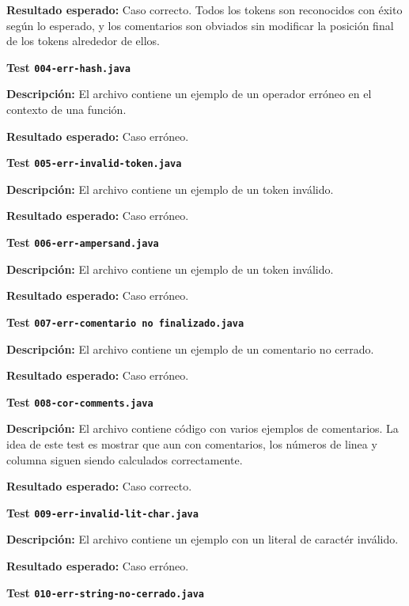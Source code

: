 \documentclass [a4paper,titlepage]{report}
\begin{document}
\textbf{Resultado esperado:} Caso correcto. Todos los tokens son
reconocidos con éxito según lo esperado, y los comentarios son
obviados sin modificar la posición final de los tokens alrededor de
ellos.




\noindent
\textbf{Test \texttt{004-err-hash.java}}

\textbf{Descripción:} El archivo contiene un ejemplo de un operador
erróneo en el contexto de una función.

\textbf{Resultado esperado:} Caso erróneo. 




\noindent
\textbf{Test \texttt{005-err-invalid-token.java}}

\textbf{Descripción:} El archivo contiene un ejemplo de un token 
inválido.

\textbf{Resultado esperado:} Caso erróneo.




\noindent
\textbf{Test \texttt{006-err-ampersand.java}}

\textbf{Descripción:} El archivo contiene un ejemplo de un token 
inválido.

\textbf{Resultado esperado:} Caso erróneo.




\noindent
\textbf{Test \texttt{007-err-comentario no finalizado.java}}

\textbf{Descripción:} El archivo contiene un ejemplo de un comentario
no cerrado.

\textbf{Resultado esperado:} Caso erróneo.




\noindent
\textbf{Test \texttt{008-cor-comments.java}}

\textbf{Descripción:} El archivo contiene código con varios ejemplos
de comentarios. La idea de este test es mostrar que aun con
comentarios, los números de linea y columna siguen siendo calculados
correctamente.

\textbf{Resultado esperado:} Caso correcto.




\noindent
\textbf{Test \texttt{009-err-invalid-lit-char.java}}

\textbf{Descripción:} El archivo contiene un ejemplo con un literal de
caractér inválido.

\textbf{Resultado esperado:} Caso erróneo.




\noindent
\textbf{Test \texttt{010-err-string-no-cerrado.java}}
\end{document}
